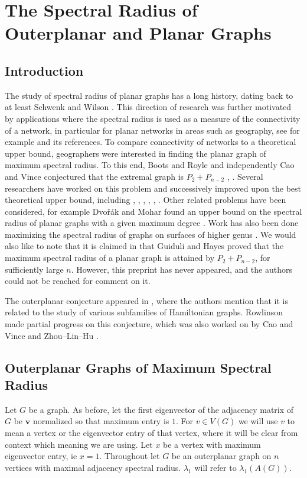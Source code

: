 \chapter{The Spectral Radius of Outerplanar and Planar Graphs}
\section{Introduction}

The study of spectral radius of planar graphs has a long history, dating back to at least Schwenk
and Wilson \cite{SchwenkWilson1978}.  This direction
of research was further motivated by applications where the spectral
radius is used as a measure of the connectivity of a network, in
particular for planar
networks in areas such as geography, see for example \cite{BootsRoyle1991}
and its references.  To compare connectivity of networks to a theoretical upper bound, geographers were
interested in finding the planar graph of maximum spectral radius. To this end, Boots and Royle and
independently Cao and Vince conjectured that the extremal graph is $P_2 + P_{n-2}$
\cite{BootsRoyle1991}, \cite{CaoVince1993}. Several researchers have worked on this problem and
successively improved upon the best theoretical upper bound, including \cite{Hong1988},
\cite{CaoVince1993}, \cite{Hong1995}, \cite{Guiduli1996}, \cite{Hong1998},
\cite{EllinghamZha2000}. Other related problems have been considered, for example Dvo\v{r}\'{a}k
and Mohar found an upper bound on the spectral radius of planar graphs
with a given maximum degree \cite{DvorakMohar2010}. Work has also been done maximizing the spectral radius of graphs on surfaces of higher genus \cite{EllinghamZha2000, Hong1995, Hong1998}. We would also like to note that it is claimed in \cite{EllinghamZha2000} that Guiduli and Hayes proved
that the maximum spectral radius of a planar graph is attained by $P_2 + P_{n-2}$,
for sufficiently large $n$. However, this preprint has never appeared, and the authors
could not be reached for comment on it.


The outerplanar conjecture appeared
in \cite{CvetkovicRowlinson1990}, where the authors mention that it is related
to the study of various subfamilies of Hamiltonian graphs.
Rowlinson \cite{Rowlinson1990} made partial progress on this conjecture, which
was also worked on by Cao and Vince \cite{CaoVince1993} and Zhou--Lin--Hu \cite{ZhouLinHu2001}.


\section{Outerplanar Graphs of Maximum Spectral Radius}\label{outerplanar}
Let $G$ be a graph. As before, let the first eigenvector of the adjacency matrix of $G$ be $\textbf{v}$ normalized so that maximum entry is $1$. For $v\in V(G)$ we will use $v$ to mean a vertex or the eigenvector entry of that vertex, where it will be clear from context which meaning we are using. Let $x$ be a vertex with maximum eigenvector entry, ie $x=1$.  Throughout let $G$ be an outerplanar graph on $n$ vertices with maximal adjacency spectral radius.  $\lambda_1$ will refer to $\lambda_1(A(G))$. 

